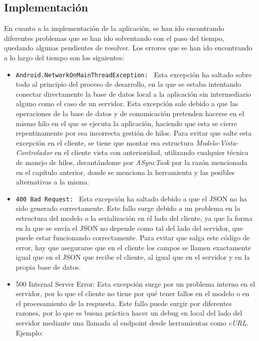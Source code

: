 \subsection{Implementación}
En cuanto a la implementación de la aplicación, se han ido encontrando
diferentes problemas que se han ido solventando con el paso del tiempo, quedando
algunas pendientes de resolver. Los errores que se han ido encontrando a lo
largo del tiempo son los siguientes:
\begin{itemize}
    \item \texttt{Android.NetworkOnMainThreadException: } Esta excepción ha
    saltado sobre todo al principio del proceso de desarrollo, en la que se
    estaba intentando conectar directamente la base de datos local a la
    aplicación sin intermediario alguno como el caso de un servidor. Esta
    excepción sale debido a que las operaciones de la base de datos y de
    comunicación pretenden hacerse en el mismo hilo en el que se ejecuta la
    aplicación, haciendo que esta se cierre repentinamente por esa incorrecta
    gestión de hilos. Para evitar que salte esta excepción en el cliente, se
    tiene que montar esa estructura \textit{Modelo-Vista-Controlador} en el
    cliente vista con anterioridad, utilizando cualquier técnica de manejo de
    hilos, decantándome por \textit{ASyncTask} por la razón mencionada en el
    capítulo anterior, donde se menciona la herramienta y las posibles
    alternativas a la misma.
    \item \texttt{400 Bad Request: } Esta excepción ha saltado debido a que el
    JSON no ha sido generado correctamente. Este fallo surge debido a un
    problema en la estructura del modelo o la serialización en el lado del
    cliente, ya que la forma en la que se envía el JSON no depende como tal del
    lado del servidor, que puede estar funcionando correctamente. Para evitar
    que salga este código de error, hay que asegurarse que en el cliente los
    campos se llamen exactamente igual que en el JSON que recibe el cliente, al
    igual que en el servidor y en la propia base de datos.
    \item {500 Internal Server Error: } Esta excepción surge por un problema interno en el servidor, por lo que el cliente no tiene por qué tener fallos en el modelo o en el procesamiento de la respuesta. Este fallo puede surgir por diferentes razones, por lo que es buena práctica hacer un debug en local del lado del servidor mediante una llamada al endpoint desde herramientas como  \textit{cURL}. Ejemplo: \begin{lstlisting}

\end{lstlisting}
\end{itemize}
